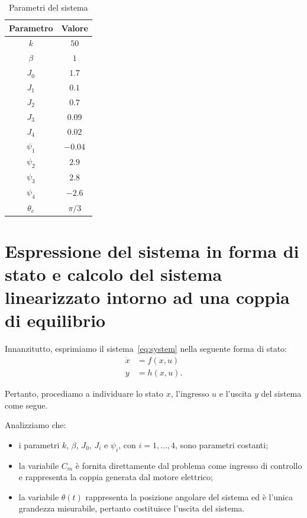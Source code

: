 \documentclass[a4paper, 11pt]{article}
\begin{document}
\begin{table}[H]
\centering
\begin{tabular}{|c|c|}
\hline
\textbf{Parametro} & \textbf{Valore} \\
\hline
$k$ & $50$ \\
$\beta$ & $1$ \\
$J_0$ & $1.7$ \\
$J_1$ & $0.1$ \\
$J_2$ & $0.7$ \\
$J_3$ & $0.09$ \\
$J_4$ & $0.02$ \\
$\psi_1$ & $-0.04$ \\
$\psi_2$ & $2.9$ \\
$\psi_3$ & $2.8$ \\
$\psi_4$ & $-2.6$ \\
$\theta_e$ & $\pi/3$ \\
\hline
\end{tabular}
\caption{Parametri del sistema}
\label{tab:system_parameters}
\end{table}

\section{Espressione del sistema in forma di stato e calcolo del sistema linearizzato intorno ad una coppia di equilibrio}

Innanzitutto, esprimiamo il sistema~\eqref{eq:system} nella seguente forma di stato:
%
\begin{subequations}
\begin{align}\label{eq:state_form}
	\dot{x} &= f(x,u)
	\\
	y &= h(x,u).
\end{align}
\end{subequations}
%

Pertanto, procediamo a individuare lo stato $x$, l'ingresso $u$ e l'uscita $y$ del sistema come segue.


Analizziamo che: 
\begin{itemize}
  \item i parametri \(k\), \(\beta\), \(J_0\), \(J_i\) e \(\psi_i\), con \(i = 1,\ldots,4\), sono parametri costanti;
  \item la variabile \(C_m\) è fornita direttamente dal problema come ingresso di controllo e rappresenta la coppia generata dal motore elettrico;
  \item la variabile \(\theta(t)\) rappresenta la posizione angolare del sistema ed è l’unica grandezza misurabile, pertanto costituisce l’uscita del sistema.
\end{itemize}
\end{document}

